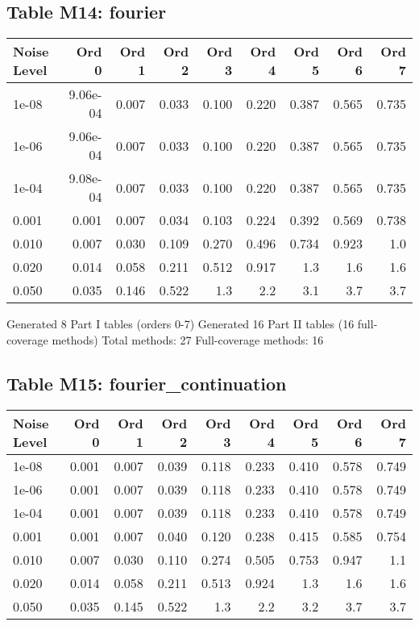 \clearpage

\subsection*{Table M14: fourier}

\begin{longtable}{lrrrrrrrr}
\toprule
\textbf{Noise Level} & \textbf{Ord 0} & \textbf{Ord 1} & \textbf{Ord 2} & \textbf{Ord 3} & \textbf{Ord 4} & \textbf{Ord 5} & \textbf{Ord 6} & \textbf{Ord 7} \\
\midrule
\endhead
1e-08 & 9.06e-04 & 0.007 & 0.033 & 0.100 & 0.220 & 0.387 & 0.565 & 0.735 \\
1e-06 & 9.06e-04 & 0.007 & 0.033 & 0.100 & 0.220 & 0.387 & 0.565 & 0.735 \\
1e-04 & 9.08e-04 & 0.007 & 0.033 & 0.100 & 0.220 & 0.387 & 0.565 & 0.735 \\
0.001 & 0.001 & 0.007 & 0.034 & 0.103 & 0.224 & 0.392 & 0.569 & 0.738 \\
0.010 & 0.007 & 0.030 & 0.109 & 0.270 & 0.496 & 0.734 & 0.923 & 1.0 \\
0.020 & 0.014 & 0.058 & 0.211 & 0.512 & 0.917 & 1.3 & 1.6 & 1.6 \\
0.050 & 0.035 & 0.146 & 0.522 & 1.3 & 2.2 & 3.1 & 3.7 & 3.7 \\
\bottomrule
\end{longtable}

\clearpage

Generated 8 Part I tables (orders 0-7)
Generated 16 Part II tables (16 full-coverage methods)
Total methods: 27
Full-coverage methods: 16
\subsection*{Table M15: fourier\_continuation}

\begin{longtable}{lrrrrrrrr}
\toprule
\textbf{Noise Level} & \textbf{Ord 0} & \textbf{Ord 1} & \textbf{Ord 2} & \textbf{Ord 3} & \textbf{Ord 4} & \textbf{Ord 5} & \textbf{Ord 6} & \textbf{Ord 7} \\
\midrule
\endhead
1e-08 & 0.001 & 0.007 & 0.039 & 0.118 & 0.233 & 0.410 & 0.578 & 0.749 \\
1e-06 & 0.001 & 0.007 & 0.039 & 0.118 & 0.233 & 0.410 & 0.578 & 0.749 \\
1e-04 & 0.001 & 0.007 & 0.039 & 0.118 & 0.233 & 0.410 & 0.578 & 0.749 \\
0.001 & 0.001 & 0.007 & 0.040 & 0.120 & 0.238 & 0.415 & 0.585 & 0.754 \\
0.010 & 0.007 & 0.030 & 0.110 & 0.274 & 0.505 & 0.753 & 0.947 & 1.1 \\
0.020 & 0.014 & 0.058 & 0.211 & 0.513 & 0.924 & 1.3 & 1.6 & 1.6 \\
0.050 & 0.035 & 0.145 & 0.522 & 1.3 & 2.2 & 3.2 & 3.7 & 3.7 \\
\bottomrule
\end{longtable}

